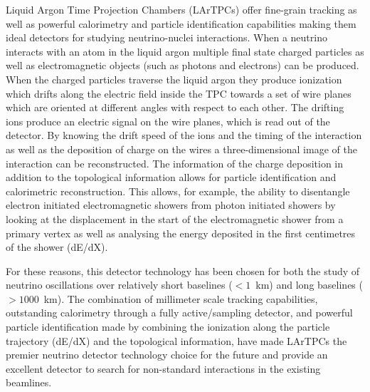 Liquid Argon Time Projection Chambers (LArTPCs) offer fine-grain tracking as well as powerful calorimetry and particle identification capabilities making them ideal detectors for studying neutrino-nuclei interactions. When a neutrino interacts with an atom in the liquid argon multiple final state charged particles as well as electromagnetic objects (such as photons and electrons) can be produced. When the charged particles traverse the liquid argon they produce ionization which drifts along the electric field inside the TPC towards a set of wire planes which are oriented at different angles with respect to each other. The drifting ions produce an electric signal on the wire planes, which is read out of the detector. By knowing the drift speed of the ions and the timing of the interaction as well as the deposition of charge on the wires a three-dimensional image of the interaction can be reconstructed. The information of the charge deposition in addition to the topological information allows for particle identification and calorimetric reconstruction. This allows, for example, the ability to disentangle electron initiated electromagnetic showers from photon initiated showers by looking at the displacement in the start of the electromagnetic shower from a primary vertex as well as analysing the energy deposited in the first centimetres of the shower (dE/dX).%


For these reasons, this detector technology has been chosen for both the study of neutrino oscillations over relatively short baselines ($<1$~km) and long baselines ($>1000$~km). The combination of millimeter scale tracking capabilities, outstanding calorimetry through a fully active/sampling detector, and powerful particle identification made by combining the ionization along the particle trajectory (dE/dX) and the topological information, have made LArTPCs the premier neutrino detector technology choice for the future and provide an excellent detector to search for non-standard interactions in the existing beamlines. 


